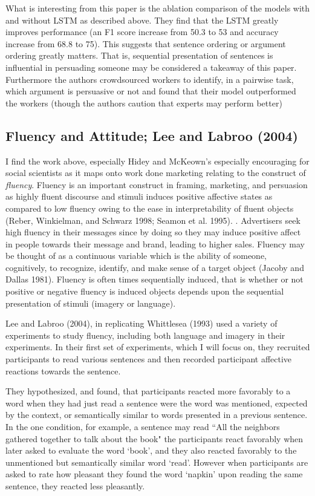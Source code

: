 \documentclass[11pt,a4paper]{article}
\begin{document}
What is interesting from this paper is the ablation comparison of the models with and without LSTM as described above. They find that the LSTM greatly improves performance (an F1 score increase from 50.3 to 53 and accuracy increase from 68.8 to 75). This suggests that sentence ordering or argument ordering greatly matters. That is, sequential presentation of sentences is influential in persuading someone may be considered a takeaway of this paper. Furthermore the authors crowdsourced workers to identify, in a pairwise task, which argument is persuasive or not and found that their model outperformed the workers (though the authors caution that experts may perform better)



\subsection{Fluency and Attitude; Lee and Labroo (2004)}
I find the work above, especially Hidey and McKeown's especially encouraging for social scientists as it maps onto work done marketing relating to the construct of \textit{fluency}. Fluency is an important construct in framing, marketing, and persuasion as highly fluent discourse and stimuli induces positive affective states as compared to low fluency owing to the ease in interpretability of fluent objects (Reber, Winkielman, and Schwarz 1998; Seamon et al. 1995). %
.  Advertisers  seek high fluency in their messages since by doing so they may induce positive affect in people towards their message and brand, leading to higher sales. Fluency may be thought of as a continuous variable which is the ability of someone, cognitively, to recognize, identify, and make sense of a target object (Jacoby and Dallas 1981). Fluency is often times sequentially induced, that is whether or not positive or negative fluency is induced objects depends upon the sequential presentation of stimuli (imagery or language). 

Lee and Labroo (2004), in replicating Whittlesea (1993) used a variety of experiments to study fluency, including  both language and imagery in their experiments. In their first set of experiments, which I will focus on, they recruited participants to read various sentences and then recorded participant affective reactions towards the sentence.

They hypothesized, and found, that participants reacted more favorably to a word when they had just read a sentence were  the word was mentioned, expected by the context, or semantically similar to words presented in a previous sentence. In the one condition, for example, a sentence may read ``All the neighbors gathered together to talk about the book"  the participants react favorably when later asked to evaluate the word `book', and they also reacted favorably to the unmentioned but semantically similar word `read'. However when participants are asked to rate how pleasant they found the word `napkin' upon reading the same sentence, they reacted less pleasantly. 
\end{document}
